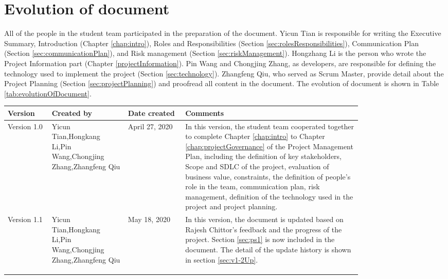 \documentclass{report}
\begin{document}
\section{Evolution of document}
\label{sec:evolutionOfDocument}
All of the people in the student team participated in the preparation of the document. Yicun Tian is responsible for writing the Executive Summary, Introduction (Chapter \ref{chap:intro}), Roles and Responsibilities (Section \ref{sec:rolesResponsibilities}), Communication Plan (Section \ref{sec:communicationPlan}), and Risk management (Section \ref{sec:riskManagement}). Hongzhang Li is the person who wrote the Project Information part (Chapter \ref{projectInformation}). Pin Wang and Chongjing Zhang, as developers, are responsible for defining the technology used to implement the project (Section \ref{sec:technology}). Zhangfeng Qiu, who served as Scrum Master, provide detail about the Project Planning (Section \ref{sec:projectPlanning}) and proofread all content in the document. The evolution of document is shown in Table \ref{tab:evolutionOfDocument}.
\begin{tabularx}{0.95\linewidth}{%
  >{\raggedright\arraybackslash}p{0.1\linewidth}%
  >{\raggedright\arraybackslash}p{0.17\linewidth}%
  >{\raggedright\arraybackslash}p{0.13\linewidth}%
  >{\raggedright\arraybackslash}p{0.40\linewidth}
  }
  \toprule{}
  Version & Created by & Date created & Comments\\
  \midrule
  Version 1.0
  & Yicun Tian,\newline Hongkang Li,\newline Pin Wang,\newline Chongjing Zhang,\newline Zhangfeng Qiu
  & April 27, 2020
  & In this version, the student team cooperated together to complete Chapter \ref{chap:intro} to Chapter \ref{chap:projectGovernance} of the Project Management Plan, including the definition of key stakeholders, Scope and SDLC of the project, evaluation of business value, constraints, the definition of people's role in the team, communication plan, risk management, definition of the technology used in the project and project planning.
  \\
  \midrule
  Version 1.1
  & Yicun Tian,\newline Hongkang Li,\newline Pin Wang,\newline Chongjing Zhang,\newline Zhangfeng Qiu
  & May 18, 2020
  & In this version, the document is updated based on Rajesh Chittor's feedback and the progress of the project. Section \ref{sec:ps1} is now included in the document. The detail of the update history is shown in section \ref{sec:v1-2Up}.
  \\
  \\
  \bottomrule
  \\
  \caption{Evolution of document}  
  \label{tab:evolutionOfDocument}
\end{tabularx}
\end{document}
